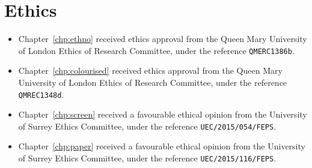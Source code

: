 \chapter*{Ethics}

\begin{itemize}
  \item Chapter~\ref{chp:ethno} received ethics approval from the Queen Mary University of
    London Ethics of Research Committee, under the reference \texttt{QMERC1386b}.
  \item Chapter~\ref{chp:colourised} received ethics approval from the Queen Mary University of
    London Ethics of Research Committee, under the reference \texttt{QMREC1348d}.
  \item Chapter~\ref{chp:screen} received a favourable ethical opinion from the University of Surrey Ethics
    Committee, under the reference \texttt{UEC/2015/054/FEPS}.
  \item Chapter~\ref{chp:paper} received a favourable ethical opinion from the University of Surrey Ethics
    Committee, under the reference \texttt{UEC/2015/116/FEPS}.
\end{itemize}

